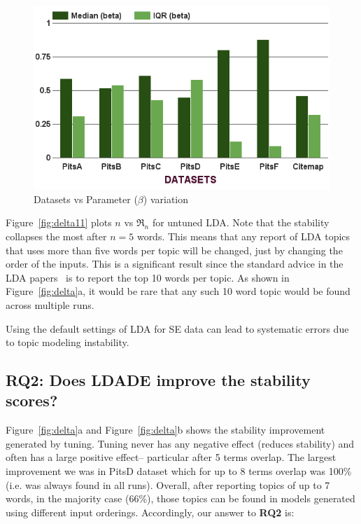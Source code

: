 \documentclass[twocolumn,5p,sort&compress]{elsarticle}
\theoremstyle{break}
\begin{document}
\begin{figure}[!t]
\begin{minipage}{.33\textwidth}
        \includegraphics[width=\linewidth]{./fig/Parameters_variation_b.png}
        \caption{Datasets vs Parameter ($\beta$) variation}
        \label{RQ3:b}
    \end{minipage}
\end{figure}

Figure~\ref{fig:delta11}   plots $n$ vs $\Re_n$ for untuned  LDA.
Note that the  stability collapses the most after $n=5$ words. This means
  that any report of LDA topics that uses more than five words per topic will
  be changed, just by changing the order of the inputs. This is a significant result
  since the standard advice in the LDA papers~\cite{panichella2013effectively, lukins2010bug}
  is to report the top 10 words per topic. As shown in Figure~\ref{fig:delta}a, it would
  be rare that any such 10 word topic would be found across multiple runs.
 \begin{lesson}
  Using the default settings of LDA for SE data can lead to systematic errors due to topic
  modeling instability. 
\end{lesson}


\subsection{\textbf{RQ2: Does LDADE improve the stability scores?}}\label{sect:stable}

 Figure~\ref{fig:delta}a and Figure~\ref{fig:delta}b shows the stability improvement
 generated by tuning.
   Tuning never
  has any negative effect (reduces stability) and often has a large positive effect--
  particular  after 5 terms overlap.
   The largest improvement  we
   was  in PitsD dataset which for up to 8 terms overlap was 100\% (i.e. was always
   found in all runs).
   Overall, after reporting topics of up to 7 words, in the majority case (66\%),
  those topics can be found in models generated using different input orderings.
  Accordingly, our answer to {\bf RQ2} is:
\end{document}
